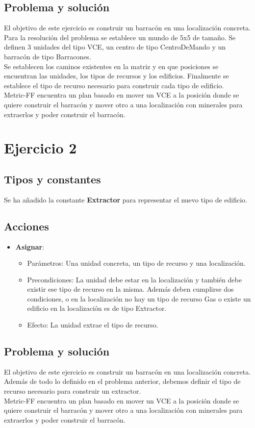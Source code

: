 \subsection{Problema y solución}
El objetivo de este ejercicio es construir un barracón en una localización concreta.\\
Para la resolución del problema se establece un mundo de 5x5 de tamaño. Se definen 3 unidades del tipo VCE, un centro de tipo CentroDeMando y un barracón de tipo Barracones.\\
Se establecen los caminos existentes en la matriz y en que posiciones se encuentran las unidades, los tipos de recursos y los edificios. Finalmente se establece el tipo de recurso necesario para construir cada tipo de edificio.\\
Metric-FF encuentra un plan basado en mover un VCE a la posición donde se quiere construir el barracón y mover otro a una localización con minerales para extraerlos y poder construir el barracón.

\section{Ejercicio 2}
\subsection{Tipos y constantes}
Se ha añadido la constante \textbf{Extractor} para representar el nuevo tipo de edificio.
\subsection{Acciones}
\begin{itemize}
   \item \textbf{Asignar}:
   \begin{itemize}
      \item Parámetros: Una unidad concreta, un tipo de recurso y una localización.
      \item Precondiciones: La unidad debe estar en la localización y también debe existir ese tipo de recurso en la misma. Además deben cumplirse dos condiciones, o en la localización no hay un tipo de recurso Gas o existe un edificio en la localización es de tipo Extractor.
      \item Efecto: La unidad extrae el tipo de recurso.
   \end{itemize}
\end{itemize}
\subsection{Problema y solución}
El objetivo de este ejercicio es construir un barracón en una localización concreta.\\
Además de todo lo definido en el problema anterior, debemos definir el tipo de recurso necesario para construir un extractor.\\
Metric-FF encuentra un plan basado en mover un VCE a la posición donde se quiere construir el barracón y mover otro a una localización con minerales para extraerlos y poder construir el barracón.

